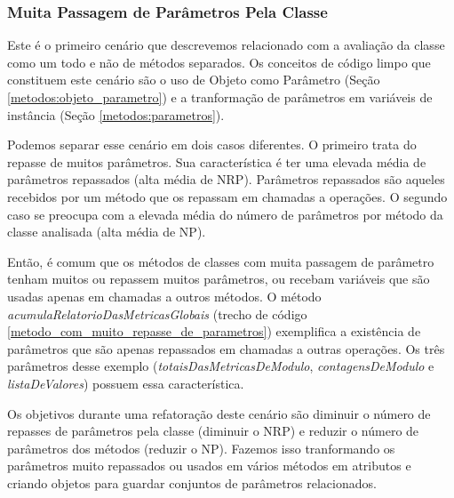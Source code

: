          
              

\subsubsection{Muita Passagem de Parâmetros Pela Classe}
	
Este é o primeiro cenário que descrevemos relacionado com a avaliação da classe como um todo e não de métodos separados. Os conceitos de código limpo que constituem este cenário são o uso de Objeto como Parâmetro (Seção \ref{metodos:objeto_parametro}) e a tranformação de parâmetros em variáveis de instância (Seção \ref{metodos:parametros}).
	
Podemos separar esse cenário em dois casos diferentes. O primeiro trata do repasse de muitos parâmetros. Sua característica é ter uma elevada média de parâmetros repassados (alta média de NRP). Parâmetros repassados são aqueles recebidos por um método que os repassam em chamadas a operações. O segundo caso se preocupa com a elevada média do número de parâmetros por método da classe analisada (alta média de NP).       
		     
Então, é comum que os métodos de classes com muita passagem de parâmetro tenham muitos ou repassem muitos parâmetros, ou recebam variáveis que são usadas apenas em chamadas a outros métodos.	O método \textit{acumulaRelatorioDasMetricasGlobais} (trecho de código \ref{metodo_com_muito_repasse_de_parametros}) exemplifica a existência de parâmetros que são apenas repassados em chamadas a outras operações. Os três parâmetros desse exemplo (\textit{totaisDasMetricasDeModulo}, \textit{contagensDeModulo} e \textit{listaDeValores}) possuem essa característica. 
	                                                               
                                     
	
Os objetivos durante uma refatoração deste cenário são diminuir o número de repasses de parâmetros pela classe (diminuir o NRP) e reduzir o número de parâmetros dos métodos (reduzir o NP). Fazemos isso tranformando os parâmetros muito repassados ou usados em vários métodos em atributos e criando objetos para guardar conjuntos de parâmetros relacionados.
	

